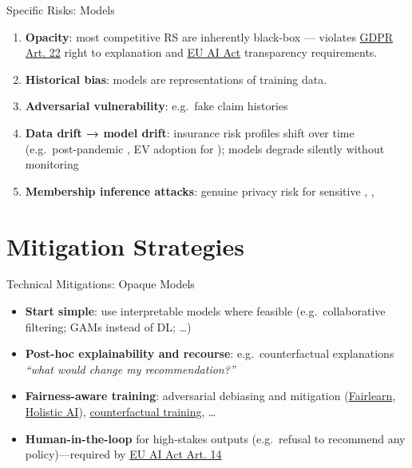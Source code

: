 \documentclass[
  ignorenonframetext,
]{beamer}
\providecommand{\tightlist}{%
  \setlength{\itemsep}{0pt}\setlength{\parskip}{0pt}}
\begin{document}
\begin{frame}{Specific Risks: Models}
\label{specific-risks-models}
\begin{enumerate}
\tightlist
\item
  \textbf{Opacity}: most competitive RS are inherently black-box ---
  violates \href{https://gdpr-info.eu/art-22-gdpr/}{GDPR Art. 22} right
  to explanation and
  \href{https://artificialintelligenceact.eu/high-level-summary/}{EU AI
  Act} transparency requirements.
\item
  \textbf{Historical bias}: models are representations of training data.
\item
  \textbf{Adversarial vulnerability}: e.g.~fake claim histories
\item
  \textbf{Data drift → model drift}: insurance risk profiles shift over
  time (e.g.~post-pandemic , EV adoption for
  ); models degrade silently without monitoring
\item
  \textbf{Membership inference attacks}: genuine privacy risk for
  sensitive , , 
\end{enumerate}
\end{frame}

\section{Mitigation Strategies}\label{mitigation-strategies}

\begin{frame}{Technical Mitigations: Opaque Models}
\label{technical-mitigations-opaque-models}
\begin{itemize}
\tightlist
\item
  \textbf{Start simple}: use interpretable models where feasible
  (e.g.~collaborative filtering; GAMs instead of DL; \ldots)
\item
  \textbf{Post-hoc explainability and recourse}: e.g.~counterfactual
  explanations \emph{``what would change my recommendation?''}
\item
  \textbf{Fairness-aware training}: adversarial debiasing and mitigation
  (\href{https://fairlearn.org/v0.13/user_guide/mitigation/adversarial.html}{Fairlearn},
  \href{https://holisticai.readthedocs.io/en/latest/getting_started/bias/mitigation/inprocessing/bc_adversarial_debiasing_adversarial_debiasing.html}{Holistic
  AI}), \href{https://arxiv.org/abs/2601.16205}{counterfactual
  training}, \ldots{}
\item
  \textbf{Human-in-the-loop} for high-stakes outputs (e.g.~refusal to
  recommend any policy)---required by
  \href{https://artificialintelligenceact.eu/article/14/}{EU AI Act Art.
  14}
\end{itemize}
\end{frame}
\end{document}
